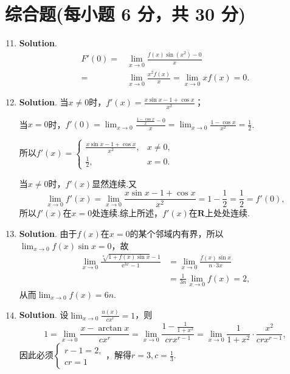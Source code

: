 \documentclass[../main.tex]{subfiles}
\begin{document}
\section{综合题(每小题 6 分，共 30 分)}
\begin{enumerate}
    \setcounter{enumi}{10}
    \item \textbf{Solution}.
          \[
              \begin{aligned}
                  F'(0)= {} & \lim_{x\to0}\frac{f(x)\sin(x^2)-0}{x}              \\
                  = {}      & \lim_{x\to0}\frac{x^2f(x)}{x}=\lim_{x\to0}xf(x)=0.
              \end{aligned}
          \]

    \item \textbf{Solution}. 当$x\neq0$时，$f'(x)=\frac{x\sin x-1+\cos x}{x^{2}}$；

          当$x=0$时，$f'(0)=\lim_{x\to0}\frac{\frac{1-\cos x}{x}-0}{x}=\lim_{x\to0}\frac{1-\cos
                  x}{x^{2}}=\frac{1}{2}$.

          所以$f'(x)=
              \begin{cases}
                  \frac{x\sin x-1+\cos x}{x^2}, & x\neq0, \\
                  \frac{1}{2},                  & x=0.
              \end{cases}$

          当$x\neq0$时，$f'(x)$显然连续.又
          \[
              \lim_{x\to0}f'(x)=\lim_{x\to0}\frac{x\sin x-1+\cos x}{x^{2}}=1-\frac{1}{2}
              =\frac{1}{2}=f'(0),
          \]
          所以$f'(x)$在$x=0$处连续.综上所述，$f'(x)$在$\mathbf{R}$上处处连续.

    \item \textbf{Solution}. 由于$f(x)$在$x=0$的某个邻域内有界，所以$\lim_{x\to0}
              f(x)\sin x=0$，故
          \[
              \begin{aligned}
                  \lim_{x\to0}\frac{\sqrt[n]{1+f(x)\sin x}-1}{\mathrm{e}^{3x}-1} & =\lim_{x\to0}\frac{f(x)\sin x}{n\cdot 3x} \\
                                                                                 & = \frac{1}{3n}\lim_{x\to0}f(x)=2,
              \end{aligned}
          \]
          从而$\lim_{x\to0}f(x)=6n$.

    \item \textbf{Solution}. 设$\lim_{x\to0}\frac{u(x)}{cx^{r}}=1$，则
          \[
              1=\lim_{x\to0}\frac{x-\arctan x}{cx^{r}}=\lim_{x\to0}\frac{1-\frac{1}{1+x^{2}}}{crx^{r-1}}
              =\lim_{x\to0}\frac{1}{1+x^{2}}\cdot\frac{x^{2}}{crx^{r-1}},
          \]
          因此必须$\begin{cases}
                  r-1=2, \\
                  cr=1
              \end{cases}$，解得$r=3,c=\frac{1}{3}$.


\end{enumerate}
\end{document}
